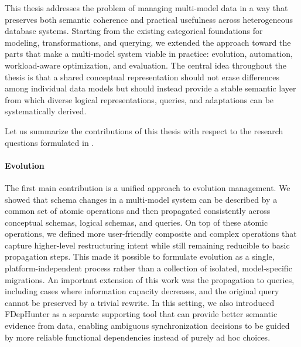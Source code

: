 \label{chap:conclusion}

This thesis addresses the problem of managing multi-model data in a way that preserves both semantic coherence and practical usefulness across heterogeneous database systems. Starting from the existing categorical foundations for modeling, transformations, and querying, we extended the approach toward the parts that make a multi-model system viable in practice: evolution, automation, workload-aware optimization, and evaluation. The central idea throughout the thesis is that a shared conceptual representation should not erase differences among individual data models but should instead provide a stable semantic layer from which diverse logical representations, queries, and adaptations can be systematically derived.

Let us summarize the contributions of this thesis with respect to the research questions formulated in .

\paragraph{Evolution}
The first main contribution is a unified approach to evolution management. We showed that schema changes in a multi-model system can be described by a common set of atomic operations and then propagated consistently across conceptual schemas, logical schemas, and queries. On top of these atomic operations, we defined more user-friendly composite and complex operations that capture higher-level restructuring intent while still remaining reducible to basic propagation steps. This made it possible to formulate evolution as a single, platform-independent process rather than a collection of isolated, model-specific migrations. An important extension of this work was the propagation to queries, including cases where information capacity decreases, and the original query cannot be preserved by a trivial rewrite. In this setting, we also introduced FDepHunter as a separate supporting tool that can provide better semantic evidence from data, enabling ambiguous synchronization decisions to be guided by more reliable functional dependencies instead of purely ad hoc choices.

